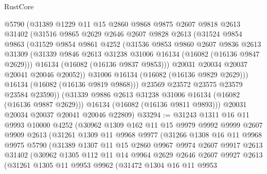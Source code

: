 \begin{lexlean}{RustCore}
\begin{coremodule}
            @5790
            (@31389
              @1229
              @11
              @15
              @2860
              @9868
              @9875
              @2607
              @9818
              @2613
              @31402
              (@31516
                @9865
                @2629
                @2646
                @2607
                @9828
                @2613
                (@31524
                  @9854
                  @9863
                  (@31529
                    @9854
                    @9861
                    @4252
                    (@31536
                      @9853
                      @9860
                      @2607
                      @9836
                      @2613
                      @31309
                      (@31339 @9846 @2613 @31238 @31006 @16134 (@16082 (@16136 @9847 @2629)))
                      @16134
                      (@16082 (@16136 @9837 @9853)))
                    @20031
                    @20034
                    @20037
                    @20041
                    @20046
                    @20052))
                @31006
                @16134
                (@16082 (@16136 @9829 @2629)))
              @16134
              (@16082 (@16136 @9819 @9868)))
            @23569
            @23572
            @23575
            @23579
            @23584
            @23590))
        (@31339 @9886 @2613 @31238 @31006 @16134 (@16082 (@16136 @9887 @2629)))
        @16134
        (@16082 (@16136 @9811 @9893)))
      @20031
      @20034
      @20037
      @20041
      @20046
      @22809)
@33294 := @31243
    @1311
    @16
    @11
    @9993
    @10000
    @4252
    (@30962
      @1309
      @162
      @11
      @15
      @9979
      @9992
      @9999
      @2607
      @9909
      @2613
      (@31261
        @1309
        @11
        @9968
        @9977
        (@31266
          @1308
          @16
          @11
          @9968
          @9975
          @5790
          (@31389
            @1307
            @11
            @15
            @2860
            @9967
            @9974
            @2607
            @9917
            @2613
            @31402
            (@30962
              @1305
              @112
              @11
              @14
              @9964
              @2629
              @2646
              @2607
              @9927
              @2613
              (@31261
                @1305
                @11
                @9953
                @9962
                (@31472
                  @1304
                  @16
                  @11
                  @9953

\end{coremodule}
\end{lexlean}
